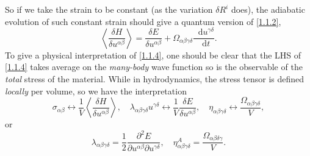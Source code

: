 \documentclass[10pt,nofootinbib,letterpaper]{revtex4}
\newcommand*\dd{\mathop{}\!\mathrm{d}}
\begin{document}
		So if we take the strain to be constant (as the variation $\delta R^i$ does), the adiabatic evolution of such constant strain should give a quantum version of \eqref{1.1.2},
		\begin{equation}\label{1.1.4}
			\left\langle\dfrac{\delta H}{\delta u^{\alpha\beta}}\right\rangle=\dfrac{\delta E}{\delta u^{\alpha\beta}}+\Omega_{\alpha\beta\gamma\delta}\dfrac{\dd u^{\gamma\delta}}{\dd t}.
		\end{equation}
		To give a physical interpretation of \eqref{1.1.4}, one should be clear that the LHS of \eqref{1.1.4} takes average on the \emph{many-body} wave function so is the observable of the \emph{total} stress of the material. While in hydrodynamics, the stress tensor is defined \emph{locally} per volume, so we have the interpretation
		\begin{equation*}
			\sigma_{\alpha\beta}\leftrightarrow\dfrac{1}{V}\left\langle\dfrac{\delta H}{\delta u^{\alpha\beta}}\right\rangle,\quad \lambda_{\alpha\beta\gamma\delta}u^{\gamma\delta}\leftrightarrow\dfrac{1}{V}\dfrac{\delta E}{\delta u^{\alpha\beta}},\quad\eta_{\alpha\beta\gamma\delta}\leftrightarrow\dfrac{\Omega_{\alpha\beta\gamma\delta}}{V},
		\end{equation*}
		or
		\begin{equation}\label{1.1.5}
			\lambda_{\alpha\beta\gamma\delta}=\dfrac{1}{2}\dfrac{\partial^2 E}{\partial u^{\alpha\beta}\partial u^{\gamma\delta}},\quad \eta^A_{\alpha\beta\gamma\delta}=\dfrac{\Omega_{\alpha\beta\delta\gamma}}{V}.
		\end{equation}
\end{document}
